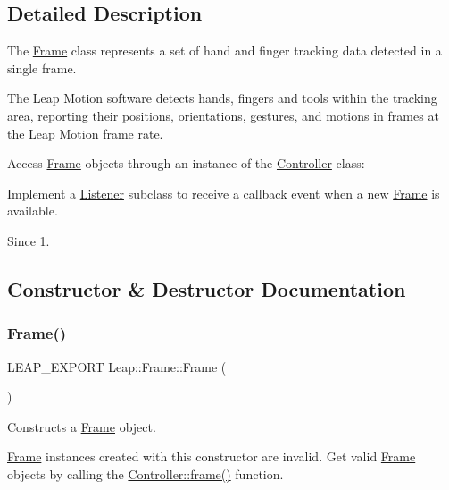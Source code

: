 \subsection{Detailed Description}
The \hyperlink{class_leap_1_1_frame}{Frame} class represents a set of hand and finger tracking data detected in a single frame.

The Leap Motion software detects hands, fingers and tools within the tracking area, reporting their positions, orientations, gestures, and motions in frames at the Leap Motion frame rate.

Access \hyperlink{class_leap_1_1_frame}{Frame} objects through an instance of the \hyperlink{class_leap_1_1_controller}{Controller} class\+:


\begin{DoxyCodeInclude}
\end{DoxyCodeInclude}


Implement a \hyperlink{class_leap_1_1_listener}{Listener} subclass to receive a callback event when a new \hyperlink{class_leap_1_1_frame}{Frame} is available. \begin{DoxySince}{Since}
1. 
\end{DoxySince}


\subsection{Constructor \& Destructor Documentation}
\mbox{\label{class_leap_1_1_frame_a6a619578cc80bcdf65f9f332a2432a2f}} 
\subsubsection{\texorpdfstring{Frame()}{Frame()}}
{\footnotesize\ttfamily L\+E\+A\+P\+\_\+\+E\+X\+P\+O\+RT Leap\+::\+Frame\+::\+Frame (\begin{DoxyParamCaption}{ }\end{DoxyParamCaption})}

Constructs a \hyperlink{class_leap_1_1_frame}{Frame} object.

\hyperlink{class_leap_1_1_frame}{Frame} instances created with this constructor are invalid. Get valid \hyperlink{class_leap_1_1_frame}{Frame} objects by calling the \hyperlink{class_leap_1_1_controller_acb45e24fc2583045212f2cfec613f5b0}{Controller\+::frame()} function.


